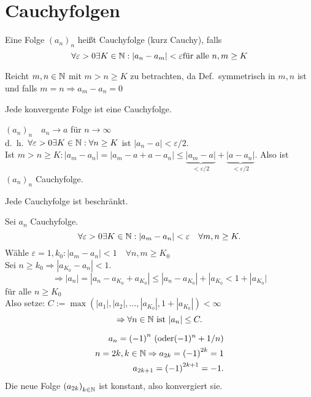\documentclass[../ana1.tex]{subfiles}
\begin{document}
\setcounter{section}{8}

\section{Cauchyfolgen}
\begin{defi}[Cauchyfolge]
	Eine Folge \({(a_n)}_n\) heißt Cauchyfolge (kurz Cauchy), falls
	\[\forall \varepsilon>0 \exists K\in\mathbb{N}: |a_n-a_m| < \varepsilon \text{für alle } n,m\geq K \]
\end{defi}
\begin{bem}
	Reicht \(m,n\in\mathbb{N} \) mit \( m>n\geq K \) zu betrachten, da Def.\ symmetrisch in \(m,n\) ist und falls \(m=n \Rightarrow a_m-a_n=0\)
\end{bem}
\begin{lem}
	Jede konvergente Folge ist eine Cauchyfolge.
\end{lem}
\begin{bew}
	\( {(a_n)}_n \quad a_n \rightarrow a \) für \(n\rightarrow\infty \) \\
	d.\ h.\  \( \forall \varepsilon > 0 \exists K \in \mathbb{N}: \forall n\geq K \) ist \( |a_n-a| < \varepsilon/2 \).\\
	Ist \(m>n\geq K: |a_m -a_n| = |a_m-a+a-a_n| \leq \underbrace{|a_m-a|}_{<\varepsilon/2} + \underbrace{ |a-a_n| }_{<\varepsilon/2}. \) Also ist \({(a_n)}_n\) Cauchyfolge.
\end{bew}
\begin{lem}
	Jede Cauchyfolge ist beschränkt.
\end{lem}
\begin{bew}
	Sei \(a_n\) Cauchyfolge. 
	\[ \forall \varepsilon > 0 \exists K\in\mathbb{N}:|a_m-a_n| < \varepsilon \quad \forall m,n\geq K. \]
	Wähle \(\varepsilon = 1, k_0: |a_m-a_n| < 1 \quad \forall n,m\geq K_0 \) \\
	Sei \(n \geq k_0 \Rightarrow |a_{K_0} - a_n| < 1. \)
	\[ \Rightarrow |a_n| = |a_n - a_{K_0} + a_{K_0}| \leq |a_n - a_{K_0}| + |a_{K_0} < 1 + |a_{K_0}| \] für alle \(n\geq K_0\) \\
	Also setze: \( C := \max ( |a_1|,|a_2|,\ldots,|a_{K_0}|,1+|a_{K_0}| ) < \infty \) 
	\[ \Rightarrow \forall n\in\mathbb{N} \text{ ist } |a_n| \leq C. \]
\end{bew}
\begin{bsp}
	\begin{align*}
		a_n = {(-1)}^n \text{ (oder} (-1)^n + 1/n \text{)} \\
		n = 2k, k\in\mathbb{N} \Rightarrow a_{2k} = {(-1)}^{2k} = 1 \\
		a_{2k+1} = {(-1)}^{2k+1} = -1.
	\end{align*}
	Die neue Folge \( {(a_{2k})}_{k\in\mathbb{N}} \) ist konstant, also konvergiert sie.
\end{bsp}
\end{document}

